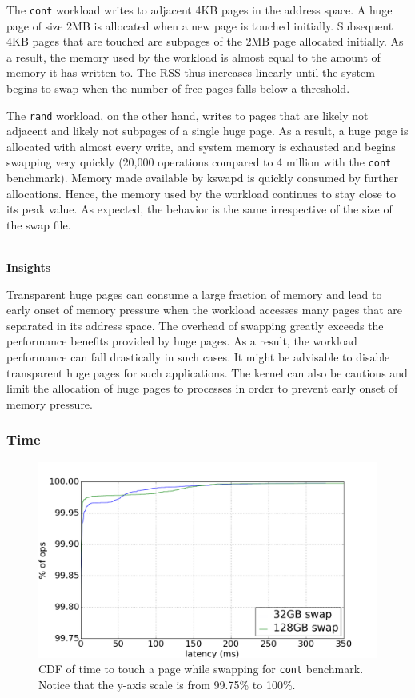 \documentclass[twocolumn,11pt]{article}
\begin{document}
The \texttt{cont} workload writes to adjacent 4KB pages in the address space. A huge page
of size 2MB is allocated when a new page is touched initially. Subsequent 4KB
pages that are touched are subpages of the 2MB page allocated initially. As a
result, the memory used by the workload is almost equal to the amount of memory
it has written to. The RSS thus increases linearly until the system begins to
swap when the number of free pages falls below a threshold. 

The \texttt{rand} workload, on the other hand, writes to pages that are likely not
adjacent and likely not subpages of a single huge page. As a result, a huge page
is allocated with almost every write, and system memory is exhausted and begins
swapping very quickly (20,000 operations compared to 4 million with the \texttt{cont} benchmark). Memory made available by kswapd is quickly consumed by
further allocations. Hence, the memory used by the workload continues to stay
close to its peak value. As expected, the behavior is the same irrespective of
the size of the swap file.


~\\ \textbf{Insights} 

Transparent huge pages can consume a large fraction of memory and lead to early
onset of memory pressure when the workload accesses many pages that are
separated in its address space. The overhead of swapping greatly exceeds the
performance benefits provided by huge pages. As a result, the workload
performance can fall drastically in such cases. It might be advisable to
disable transparent huge pages for such applications. The kernel can also be
cautious and limit the allocation of huge pages to processes in order to
prevent early onset of memory pressure.

\subsubsection{Time}

\begin{figure}[t]
    \includegraphics[width=\columnwidth]{figures/swap_touch_time_cont_cdf}
    \caption{CDF of time to touch a page while swapping for \texttt{cont}
    benchmark. Notice that the y-axis scale is from 99.75\% to 100\%.
    \label{fig:swap_time_cont_cdf}}
\end{figure}
\end{document}
